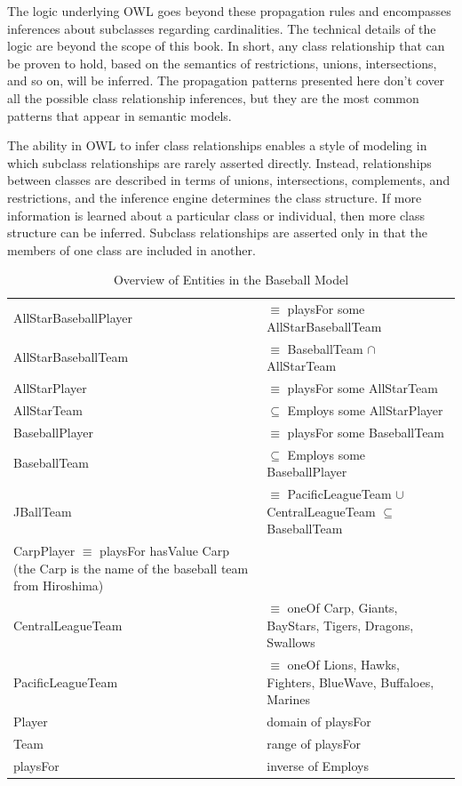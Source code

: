 The logic underlying OWL goes beyond these propagation rules and
encompasses inferences about subclasses regarding cardinalities. The
technical details of the logic are beyond the scope of this book. In
short, any class relationship that can be proven to hold, based on the
semantics of restrictions, unions, intersections, and so on, will be
inferred. The propagation patterns presented here don't cover all the
possible class relationship inferences, but they are the most common
patterns that appear in semantic models.

The ability in OWL to infer class relationships enables a style of
modeling in which subclass relationships are rarely asserted directly.
Instead, relationships between classes are described in terms
of unions, intersections, complements, and restrictions, and the
inference engine determines the class structure. If more information is
learned about a particular class or individual, then more class
structure can be inferred. Subclass relationships are asserted only in
that the members of one class are included in another.




\begin{table}
\caption{Overview of Entities in the Baseball Model}
\label{tab:ch13.1}
\begin{tabular}{|ll|}
AllStarBaseballPlayer&$\equiv$ playsFor some AllStarBaseballTeam \\
AllStarBaseballTeam&$\equiv$ BaseballTeam $\cap$ AllStarTeam \\
AllStarPlayer&$\equiv$ playsFor some AllStarTeam  \\
AllStarTeam&$\subseteq$ Employs some AllStarPlayer \\ 
BaseballPlayer&$\equiv$ playsFor some BaseballTeam  \\
BaseballTeam&$\subseteq$ Employs some BaseballPlayer \\
JBallTeam&$\equiv$ PacificLeagueTeam $\cup$ CentralLeagueTeam $\subseteq$ BaseballTeam \\
CarpPlayer $\equiv$ playsFor hasValue Carp (the Carp is the name of the
baseball team from Hiroshima) \\
CentralLeagueTeam&$\equiv$ oneOf Carp, Giants, BayStars, Tigers, Dragons, Swallows \\
PacificLeagueTeam&$\equiv$ oneOf Lions, Hawks, Fighters, BlueWave, Buffaloes, Marines \\
Player&domain of playsFor  \\
Team&range of playsFor  \\
playsFor&inverse of Employs \\
\end{tabular}
\end{table}



